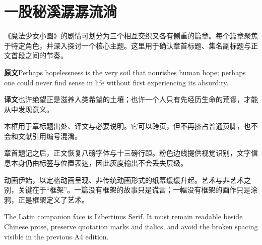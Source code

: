 \documentclass[fontset=none,openany,10pt,twoside]{ctexbook}
\begin{document}
\thispagestyle{empty}
\clearpage

\setcounter{chapter}{0}
\chapter{一股秘溪潺潺流淌}
《魔法少女小圆》的剧情可划分为三个相互交织又各有侧重的篇章。每个篇章聚焦于特定角色，并深入探讨一个核心主题。这里用于确认章首标题、集名副标题与正文首段之间的节奏。
\clearpage

\thispagestyle{chapteropening}
\begin{chapteropeningnote}
\textbf{原文}\quad Perhaps hopelessness is the very soil that nourishes human hope; perhaps one could never find sense in life without first experiencing its absurdity.

\textbf{译文}\quad 也许绝望正是滋养人类希望的土壤；也许一个人只有先经历生命的荒谬，才能从中发现意义。

本框用于章标题出处、译文与必要说明。它可以跨页，但不再挤占普通页脚，也不会和文献引用编号混淆。
\end{chapteropeningnote}
章首题记之后，正文恢复八磅字体与十三磅行距。粉色边线提供视觉识别，文字信息本身仍由标签与位置表达，因此灰度输出不会丢失层级。
\clearpage

\pagestyle{bookbody}
\noindent
动画伊始，以定格动画呈现、非传统动画形式的纸幕缓缓升起。艺术与非艺术之别，关键在于“框架”。一篇没有框架的故事只是谎言；一幅没有框架的画作只是涂鸦，正是框架定义了艺术。

The Latin companion face is Libertinus Serif. It must remain readable beside Chinese prose, preserve quotation marks and italics, and avoid the broken spacing visible in the previous A4 edition.
\end{document}
